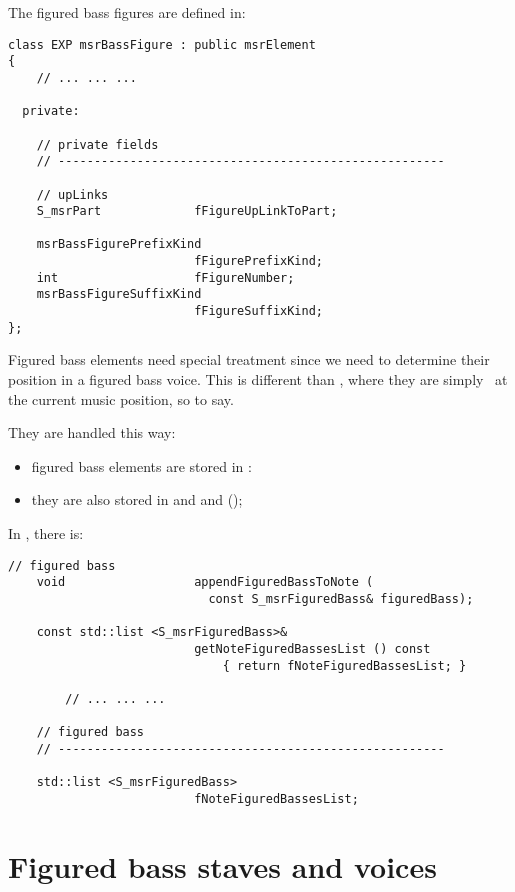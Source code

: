 The figured bass figures are defined in:
\begin{lstlisting}[language=CPlusPlus]
class EXP msrBassFigure : public msrElement
{
	// ... ... ...

  private:

    // private fields
    // ------------------------------------------------------

    // upLinks
    S_msrPart             fFigureUpLinkToPart;

    msrBassFigurePrefixKind
                          fFigurePrefixKind;
    int                   fFigureNumber;
    msrBassFigureSuffixKind
                          fFigureSuffixKind;
};
\end{lstlisting}

Figured bass elements need special treatment since we need to determine their position in a figured bass voice. This is different than \mxml, where they are simply \drawn\ at the current music position, so to say.

They are handled this way:
\begin{itemize}
\item figured bass elements are stored in :
\item they are also stored in  and  and  (\denorm);
\end{itemize}

In , there is:
\begin{lstlisting}[language=CPlusPlus]
    // figured bass
    void                  appendFiguredBassToNote (
                            const S_msrFiguredBass& figuredBass);

    const std::list <S_msrFiguredBass>&
                          getNoteFiguredBassesList () const
                              { return fNoteFiguredBassesList; }

		// ... ... ...

    // figured bass
    // ------------------------------------------------------

    std::list <S_msrFiguredBass>
                          fNoteFiguredBassesList;
\end{lstlisting}


\section{Figured bass staves and voices}

